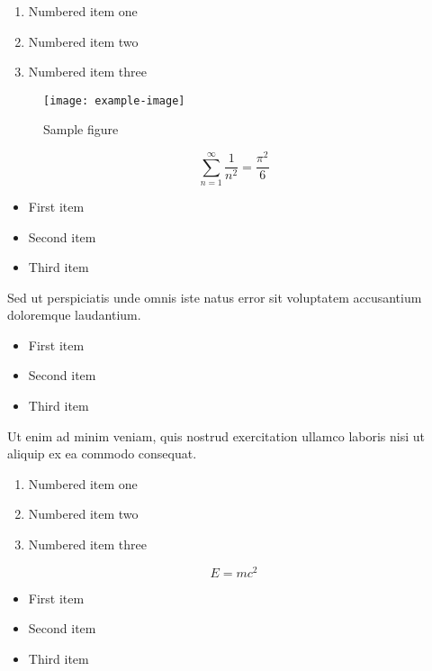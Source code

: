 \documentclass{article}
\begin{document}
\begin{enumerate}
\item Numbered item one
\item Numbered item two
\item Numbered item three
\end{enumerate}

\begin{figure}[h]
    \centering
    \texttt{[image: example-image]}
    \caption{Sample figure}
    \label{fig:sample}
\end{figure}

\begin{equation}
    \sum_{n=1}^{\infty} \frac{1}{n^2} = \frac{\pi^2}{6}
\end{equation}

\begin{itemize}
\item First item
\item Second item
\item Third item
\end{itemize}

Sed ut perspiciatis unde omnis iste natus error sit voluptatem accusantium doloremque laudantium.


\begin{itemize}
\item First item
\item Second item
\item Third item
\end{itemize}

Ut enim ad minim veniam, quis nostrud exercitation ullamco laboris nisi ut aliquip ex ea commodo consequat.

\begin{enumerate}
\item Numbered item one
\item Numbered item two
\item Numbered item three
\end{enumerate}

\begin{equation}
    E = mc^2
\end{equation}

\begin{itemize}
\item First item
\item Second item
\item Third item
\end{itemize}
\end{document}
